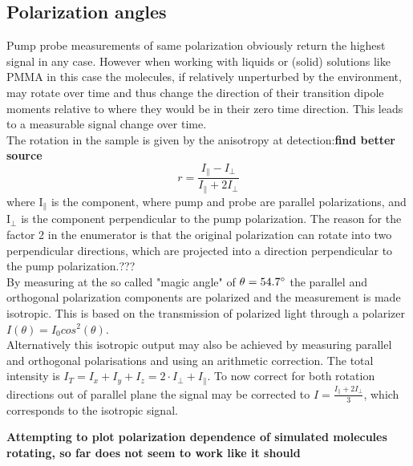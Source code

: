 \documentclass[twoside,openright]{scrreprt}
\begin{document}
\subsection{Polarization angles}
Pump probe measurements of same polarization obviously return the highest signal in any case. However when working with liquids or (solid) solutions like PMMA in this case the molecules, if relatively unperturbed by the environment, may rotate over time and thus change the direction of their transition dipole moments relative to where they would be in their zero time direction. This leads to a measurable signal change over time.\\
The rotation in the sample is given by the anisotropy at detection:\textbf{find better source}
\begin{equation*}
r = \frac{I_{\parallel}-I_{\perp}}{I_{\parallel}+2I_{\perp}}
\end{equation*}
where $\mathrm{I_\parallel}$ is the component, where pump and probe are parallel polarizations, and $\mathrm{I_\perp}$ is the component perpendicular to the pump polarization. The reason for the factor 2 in the enumerator is that the original polarization can rotate into two perpendicular directions, which are projected into a direction perpendicular to the pump polarization.???\\
By measuring at the so called "magic angle" of $\theta = 54.7 \degree$ the parallel and orthogonal polarization components are polarized and the measurement is made isotropic. This is based on the transmission of polarized light through a polarizer $I(\theta) = I_0 cos^2(\theta)$.\\
Alternatively this isotropic output may also be achieved by measuring parallel and orthogonal polarisations and using an arithmetic correction. The total intensity is $I_T = I_x+I_y+I_z = 2\cdot I_\perp + I_\parallel$. To now correct for both rotation directions out of parallel plane the signal may be corrected to $I = \frac{I_\parallel + 2I_\perp}{3}$, which corresponds to the isotropic signal.\cite{Zheng2020}

\textbf{Attempting to plot polarization dependence of simulated molecules rotating, so far does not seem to work like it should}

\end{document}
